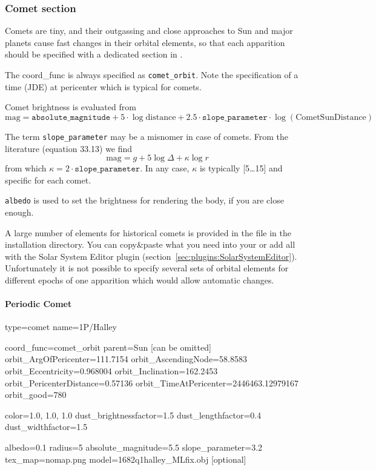 \subsubsection{Comet section}
\label{sec:ssystem.ini:Comet}

Comets are tiny, and their outgassing and close approaches to Sun and
major planets cause fast changes in their orbital elements, so that
each apparition should be specified with a dedicated section in
. 

The coord\_func is always specified as \texttt{comet\_orbit}.  Note the
specification of a time (JDE) at pericenter which is typical for
comets.

Comet brightness is evaluated from
\begin{equation}
  \label{eq:comet_magnitudes}
  \mathrm{mag}=\mathtt{absolute\_magnitude}+5\cdot\log{\mathrm{distance}} + 2.5\cdot\mathtt{slope\_parameter}\cdot\log(\mathrm{CometSunDistance})
\end{equation}

The term \texttt{slope\_parameter} may be a misnomer in case of
comets. From the literature \citep{AstronomicalAlgorithms:1998} (equation 33.13) we find
\begin{equation}
  \label{eq:comet_magnitudes_Meeus}
  \mathrm{mag}=g+5\log\Delta + \kappa\log r
\end{equation}
from which $\kappa=2\cdot\mathtt{slope\_parameter}$. In any case, $\kappa$ is typically [5\ldots15] and specific for each comet.

\texttt{albedo} is used to set the brightness for rendering the body,
if you are close enough. 

A large number of elements for historical comets is provided in the
file  in the installation directory. You
can copy\&paste what you need into your
 or add all with the Solar System Editor plugin (section~\ref{sec:plugins:SolarSystemEditor}). 
Unfortunately it is not possible to specify
several sets of orbital elements for different epochs of one apparition which would
allow automatic changes.

\paragraph{Periodic Comet}
\label{sec:ssystem.ini:Comet:Periodic}

\begin{configfile}
[1phalley]
type=comet  
name=1P/Halley

coord_func=comet_orbit
parent=Sun [can be omitted]
orbit_ArgOfPericenter=111.7154
orbit_AscendingNode=58.8583
orbit_Eccentricity=0.968004
orbit_Inclination=162.2453
orbit_PericenterDistance=0.57136
orbit_TimeAtPericenter=2446463.12979167
orbit_good=780

color=1.0, 1.0, 1.0
dust_brightnessfactor=1.5
dust_lengthfactor=0.4
dust_widthfactor=1.5

albedo=0.1
radius=5
absolute_magnitude=5.5
slope_parameter=3.2
tex_map=nomap.png
model=1682q1halley_MLfix.obj [optional]
\end{configfile}


